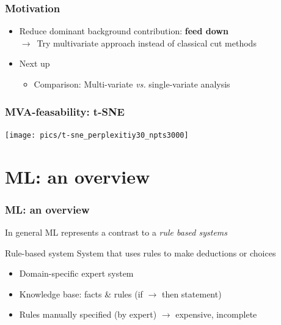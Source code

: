 \documentclass{beamer}
\begin{document}
{
\begin{frame}
    \frametitle{Motivation}
    \begin{itemize}
        \item Reduce dominant background contribution: \textbf{feed down}\\\hspace*{5mm}$\to$~Try multivariate approach instead of classical cut methods\\\vspace*{5mm}
        \item Next up
        \begin{itemize}
            \item Comparison: Multi-variate \emph{vs.} single-variate analysis
        \end{itemize}
     \end{itemize}
\end{frame}
}


\begin{frame}
    \frametitle{MVA-feasability: t-SNE}
    \centering\texttt{[image: pics/t-sne\_perplexitiy30\_npts3000]}%
\end{frame}





\section{ML: an overview} %

\begin{frame}
    \frametitle{ML: an overview}
    In general ML represents a contrast to a \emph{rule based systems}
    \begin{block}{Rule-based system}
        System that uses rules to make deductions or choices
        \begin{itemize}
            \item<1-> Domain-specific expert system
            \item<2-> Knowledge base: facts \& rules (if $\to$ then statement)
            \item<3-> Rules manually specified (by expert) $\to$ expensive, incomplete
        \end{itemize}
    \end{block}
\end{frame}
\end{document}
